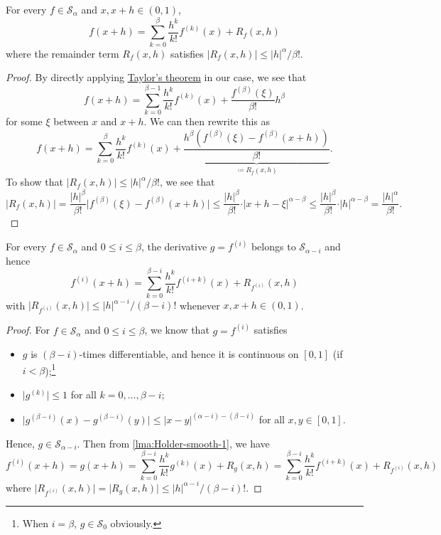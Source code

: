 \begin{lemma}\label{lma:Holder-smooth-1}
	For every \(f\in \mathcal{S} _\alpha \) and \(x, x+h \in (0, 1)\),
	\[
		f(x+h) = \sum_{k=0}^{\beta } \frac{h^k}{k!} f^{(k)}(x) + R_f(x, h)
	\]
	where the remainder term \(R_f(x, h)\) satisfies \(\vert R_f (x, h) \vert \leq \vert h \vert ^\alpha / \beta !\).
\end{lemma}
\begin{proof}
	By directly applying \hyperref[thm:Taylor]{Taylor's theorem} in our case, we see that
	\[
		f(x+h) = \sum_{k=0}^{\beta -1} \frac{h^k}{k!}f^{(k)}(x) + \frac{f^{(\beta )}(\xi )}{\beta !} h^\beta
	\]
	for some \(\xi\) between \(x\) and \(x+h\). We can then rewrite this as
	\[
		f(x+h) = \sum_{k=0}^{\beta } \frac{h^k}{k!}f^{(k)}(x) + \underbrace{\frac{h^\beta (f^{(\beta )}(\xi ) - f^{(\beta )}(x+h) )}{\beta !}}_{\coloneqq R_f(x, h)}.
	\]
	To show that \(\vert R_f(x, h) \vert \leq \vert h \vert ^\alpha / \beta !\), we see that
	\[
		\vert R_f(x, h) \vert
		= \frac{\vert h \vert ^\beta }{\beta !} \vert f^{(\beta )}(\xi ) - f^{(\beta )}(x+h) \vert
		\leq \frac{\vert h \vert ^\beta }{\beta !}\cdot \vert x+h - \xi \vert ^{\alpha - \beta }
		\leq \frac{\vert h \vert ^\beta }{\beta !}\cdot \vert h \vert ^{\alpha - \beta }
		= \frac{\vert h \vert ^\alpha }{\beta !}.
	\]
\end{proof}

\begin{lemma}\label{lma:Holder-smooth-2}
	For every \(f\in \mathcal{S} _\alpha \) and \(0 \leq i \leq \beta \), the derivative \(g = f^{(i)}\) belongs to \(\mathcal{S} _{\alpha - i}\) and hence
	\[
		f^{(i)} (x + h) = \sum_{k=0}^{\beta - i} \frac{h^k}{k!}f^{(i+k)}(x) + R_{f^{(i)}}(x, h)
	\]
	with \(\vert R_{f^{(i)}} (x, h) \vert \leq \vert h \vert ^{\alpha - i} / (\beta - i)!\) whenever \(x, x+h\in (0, 1)\).
\end{lemma}
\begin{proof}
	For \(f\in \mathcal{S} _\alpha \) and \(0 \leq i \leq \beta \), we know that \(g = f^{(i)}\) satisfies
	\begin{itemize}
		\item \(g\) is \((\beta - i)\)-times differentiable, and hence it is continuous on \([0, 1]\) (if \(i < \beta \));\footnote{When \(i = \beta \), \(g\in \mathcal{S} _0\) obviously.}
		\item \(\vert g^{(k)} \vert \leq 1\) for all \(k = 0, \dots , \beta - i\);
		\item \(\vert g^{(\beta - i)} (x) - g^{(\beta - i)}(y)\vert \leq \vert x - y \vert ^{(\alpha - i) - (\beta - i)}\) for all \(x, y\in [0, 1]\).
	\end{itemize}
	Hence, \(g \in \mathcal{S} _{\alpha - i}\). Then from \autoref{lma:Holder-smooth-1}, we have
	\[
		f^{(i)}(x+h) = g(x+h)
		= \sum_{k=0}^{\beta - i}\frac{h^k}{k!} g^{(k)}(x) + R_g(x, h)
		= \sum_{k=0}^{\beta - i} \frac{h^k}{k!} f^{(i+k)}(x) + R_{f^{(i)}}(x, h)
	\]
	where \(\vert R_{f^{(i)}} (x, h)\vert = \vert R_g(x, h) \vert \leq \vert h \vert ^{\alpha - i} / (\beta - i)!\).
\end{proof}

